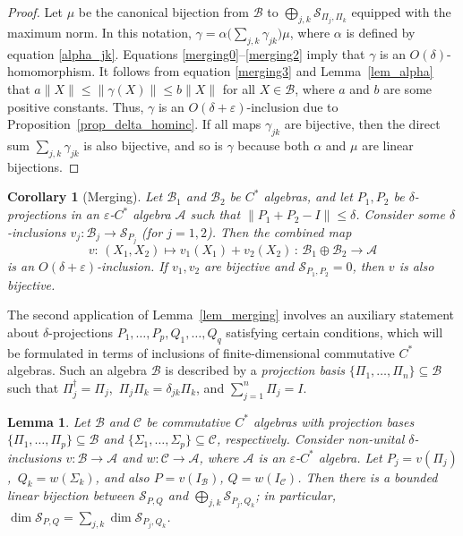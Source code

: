 \documentclass[12pt]{article}
\newcommand{\calA}{\mathcal{A}}
\newcommand{\calB}{\mathcal{B}}
\newcommand{\calC}{\mathcal{C}}
\newcommand{\calS}{\mathcal{S}}
\newcommand{\eps}{\varepsilon}
\renewcommand{\le}{\leqslant}
\newtheorem{Lemma}[Theorem]{Lemma}
\newtheorem{Corollary}[Theorem]{Corollary}
\newtheorem[definition]{Definition}[Theorem]{Definition}
\newtheorem[remark]{Example}[Theorem]{Example}
\newtheorem[remark]{Remark}[Theorem]{Remark}
\newtheorem[remark]{Question}[Theorem]{Open question}
\newtheorem*[definition]{definition}{Definition}
\newtheorem*[remark]{example}{Example}
\newtheorem*[remark]{remark}{Remark}
\newtheorem*[remark]{question}{Open question}
\numberwithin{equation}{section}
\begin{document}
\begin{proof}
Let $\mu$ be the canonical bijection from $\calB$ to $\bigoplus_{j,k}\calS_{\Pi_j,\Pi_k}$ equipped with the maximum norm. In this notation, $\gamma=\alpha\bigl(\sum_{j,k}\gamma_{jk}\bigr)\mu$, where $\alpha$ is defined by equation \eqref{alpha_jk}. Equations \eqref{merging0}--\eqref{merging2} imply that $\gamma$ is an $O(\delta)$-homomorphism. It follows from equation \eqref{merging3} and Lemma~\ref{lem_alpha} that $a\|X\|\le\|\gamma(X)\|\le b\|X\|$ for all $X\in\calB$, where $a$ and $b$ are some positive constants. Thus, $\gamma$ is an $O(\delta+\eps)$-inclusion due to Proposition~\ref{prop_delta_hominc}. If all maps $\gamma_{jk}$ are bijective, then the direct sum $\sum_{j,k}\gamma_{jk}$ is also bijective, and so is $\gamma$ because both $\alpha$ and $\mu$ are linear bijections.
\end{proof}

\begin{Corollary}[Merging]\label{cor_merge_sum}
Let $\calB_1$ and $\calB_2$ be $C^*$ algebras, and let $P_1,P_2$ be $\delta$-projections in an $\eps$-$C^*$ algebra $\calA$ such that $\|P_1+P_2-I\|\le\delta$. Consider some $\delta$-inclusions $v_j\colon\calB_j\to\calS_{P_j}$ (for $j=1,2$). Then the combined map
\begin{equation}
v\colon\, (X_1,X_2)\mapsto v_1(X_1)+v_2(X_2)\,\colon\,
\calB_1\oplus\calB_2\to\calA
\end{equation}
is an $O(\delta+\eps)$-inclusion. If $v_1,v_2$ are bijective and $\calS_{P_1,P_2}=0$, then $v$ is also bijective.
\end{Corollary}

The second application of Lemma~\ref{lem_merging} involves an auxiliary statement about $\delta$-projections $P_1,\dots,P_p,Q_1,\dots,Q_q$ satisfying certain conditions, which will be formulated in terms of inclusions of finite-dimensional commutative $C^*$ algebras. Such an algebra $\calB$ is described by a \emph{projection basis} $\{\Pi_1,\dots,\Pi_n\}\subseteq\calB$ such that $\Pi_j^\dag=\Pi_j$,\, $\Pi_j\Pi_k=\delta_{jk}\Pi_k$, and $\sum_{j=1}^{n}\Pi_j=I$.

\begin{Lemma}\label{lem_add_dim}
Let $\calB$ and $\calC$ be commutative $C^*$ algebras with projection bases $\{\Pi_1,\dots,\Pi_p\}\subseteq\calB$ and $\{\Sigma_1,\dots,\Sigma_p\}\subseteq\calC$, respectively. Consider non-unital $\delta$-inclusions $v\colon\calB\to\calA$ and $w\colon\calC\to\calA$, where $\calA$ is an $\eps$-$C^*$ algebra. Let $P_j=v(\Pi_j)$,\, $Q_k=w(\Sigma_k)$, and also $P=v(I_\calB)$, $Q=w(I_\calC)$. Then there is a bounded linear bijection between $\calS_{P,Q}$ and $\bigoplus_{j,k}\calS_{P_j,Q_k}$; in particular, $\dim\calS_{P,Q}=\sum_{j,k}\dim\calS_{P_j,Q_k}$.
\end{Lemma}
\end{document}
